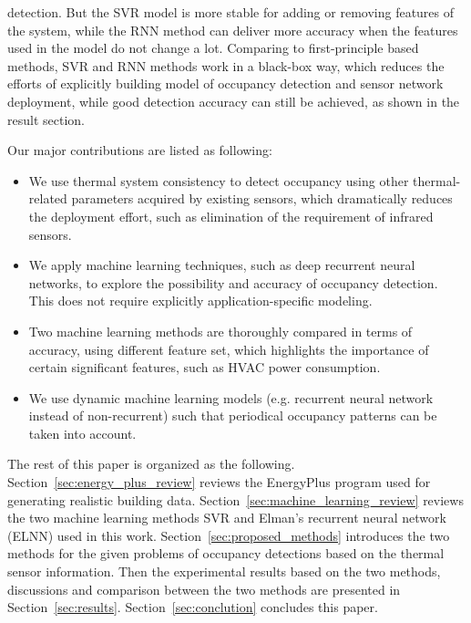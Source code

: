 detection. \textcolor{feb18rev}{But the SVR model is more stable for
  adding or removing features of the system, while the RNN method can
  deliver more accuracy when the features used in the model do not
  change a lot. Comparing to first-principle based methods, SVR and
  RNN methods work in a black-box way, which reduces the efforts of
  explicitly building model of occupancy detection and sensor network
  deployment, while good detection accuracy can still be achieved, as
  shown in the result section.}\textcolor{feb18rev}{Our major
  contributions are listed as following:
\begin{itemize}
\item We use thermal system consistency to detect occupancy using other
    thermal-related parameters acquired by existing sensors, which dramatically
    reduces the deployment effort, such as elimination of the requirement
    of infrared sensors.
\item We apply machine learning techniques, such as deep recurrent neural
    networks, to explore the possibility and accuracy of occupancy detection.
    This does not require explicitly application-specific modeling.
\item Two machine learning methods are thoroughly compared in terms of accuracy,
    using different feature set, which highlights the importance of certain
    significant features, such as HVAC power consumption.
\item We use dynamic machine learning models (e.g. recurrent neural network
    instead of non-recurrent) such that periodical occupancy patterns can be taken
    into account.
\end{itemize}
}

The rest of this paper is organized as the following.
Section~\ref{sec:energy_plus_review} reviews the EnergyPlus program used for
generating realistic building data. Section~\ref{sec:machine_learning_review}
reviews the two machine learning methods SVR and Elman's recurrent neural
network (ELNN) used in this work. Section~\ref{sec:proposed_methods} introduces
the two methods for the given problems of occupancy detections based on the
thermal sensor information. Then the experimental results based on the two
methods, discussions and comparison between the two methods are presented in
Section~\ref{sec:results}. Section~\ref{sec:conclution} concludes this paper.
